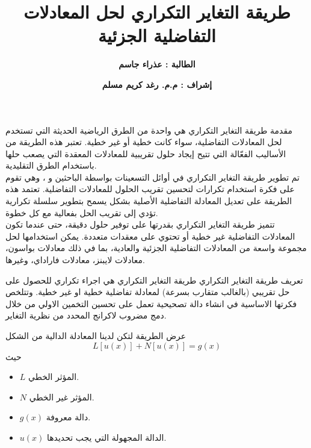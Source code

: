 

\title{\textbf{طريقة التغاير التكراري لحل المعادلات التفاضلية الجزئية}}
\author{\textbf{الطالبة : عذراء جاسم}}
\date{\textbf{إشراف : م.م. رغد كريم مسلم}}


	\abovedisplayskip=0pt
	\belowdisplayskip=0pt
	\maketitle
	
	\timesfont
	
	\begin{frame}{مقدمة}
		طريقة التغاير التكراري
		 هي واحدة من الطرق الرياضية الحديثة التي تستخدم لحل المعادلات التفاضلية، سواء كانت خطية أو غير خطية. تعتبر هذه الطريقة من الأساليب الفعّالة التي تتيح إيجاد حلول تقريبية للمعادلات المعقدة التي يصعب حلها باستخدام الطرق التقليدية.\\
		\noindent
		تم تطوير طريقة التغاير التكراري في أوائل التسعينات بواسطة الباحثين و ، وهي تقوم على فكرة استخدام تكرارات لتحسين تقريب الحلول للمعادلات التفاضلية. تعتمد هذه الطريقة على تعديل المعادلة التفاضلية الأصلية بشكل يسمح بتطوير سلسلة تكرارية تؤدي إلى تقريب الحل بفعالية مع كل خطوة.\\
		\noindent
		تتميز طريقة التغاير التكراري بقدرتها على توفير حلول دقيقة، حتى عندما تكون المعادلات التفاضلية غير خطية أو تحتوي على معقدات متعددة. يمكن استخدامها لحل مجموعة واسعة من المعادلات التفاضلية الجزئية والعادية، بما في ذلك معادلات بواسون، معادلات لايبنز، معادلات فاراداي، وغيرها.
	\end{frame}
	
	\begin{frame}
		\begin{exampleblock}{تعريف طريقة التغاير التكراري} 
			طريقة التغاير التكراري هي اجراء تكراري للحصول على حل تقريبي (بالغالب متقارب بسرعة) لمعادلة تفاضلية خطية او غير خطية. وتتلخص فكرتها الاساسية في انشاء دالة تصحيحية تعمل على تحسين التخمين الاولي من خلال دمج مضروب لاكرانج المحدد من نظرية التغاير.
		\end{exampleblock}
		
		\begin{exampleblock}{عرض الطريقة}
			لتكن لدينا المعادلة الدالية من الشكل 
			\[
			L[u(x)] + N[u(x)] = g(x)
			\]
			حيث
			\begin{itemize}
				\item $L$ المؤثر الخطي.
				\item $N$ المؤثر غير الخطي.
				\item $g(x)$ دالة معروفة.
				\item $u(x)$ الدالة المجهولة التي يجب تحديدها.
			\end{itemize}
		\end{exampleblock}
	\end{frame}
	
